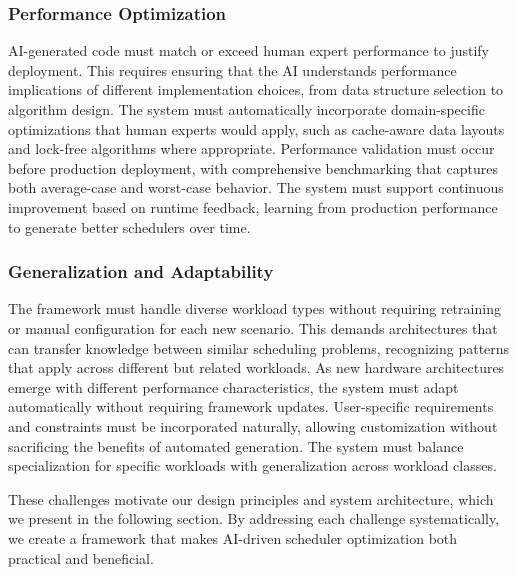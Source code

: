 \subsubsection{Performance Optimization}

AI-generated code must match or exceed human expert performance to justify deployment. This requires ensuring that the AI understands performance implications of different implementation choices, from data structure selection to algorithm design. The system must automatically incorporate domain-specific optimizations that human experts would apply, such as cache-aware data layouts and lock-free algorithms where appropriate. Performance validation must occur before production deployment, with comprehensive benchmarking that captures both average-case and worst-case behavior. The system must support continuous improvement based on runtime feedback, learning from production performance to generate better schedulers over time.

\subsubsection{Generalization and Adaptability}

The framework must handle diverse workload types without requiring retraining or manual configuration for each new scenario. This demands architectures that can transfer knowledge between similar scheduling problems, recognizing patterns that apply across different but related workloads. As new hardware architectures emerge with different performance characteristics, the system must adapt automatically without requiring framework updates. User-specific requirements and constraints must be incorporated naturally, allowing customization without sacrificing the benefits of automated generation. The system must balance specialization for specific workloads with generalization across workload classes.

These challenges motivate our design principles and system architecture, which we present in the following section. By addressing each challenge systematically, we create a framework that makes AI-driven scheduler optimization both practical and beneficial.